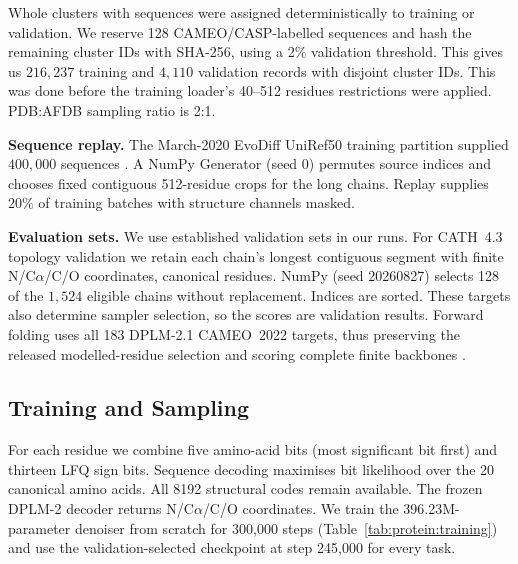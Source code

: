 Whole clusters with sequences were assigned deterministically to training or validation. We reserve 128 CAMEO/CASP-labelled sequences and hash the remaining cluster IDs with SHA-256, using a 2\% validation threshold. This gives us $216{,}237$ training and $4{,}110$ validation records with disjoint cluster IDs. This was done before the training loader's 40--512 residues restrictions were applied. PDB:AFDB sampling ratio is 2:1. 

\textbf{Sequence replay.} The March-2020 EvoDiff UniRef50 training partition supplied $400{,}000$ sequences \citep{protein:uniref}. A NumPy Generator (seed 0) permutes source indices and chooses fixed contiguous 512-residue crops for the long chains. Replay supplies $20\%$ of training batches with structure channels masked.

\textbf{Evaluation sets.} We use established validation sets in our runs. For CATH~4.3 topology validation \citep{protein:cath} we retain each chain's longest contiguous segment with finite N/C$\alpha$/C/O coordinates, canonical residues. NumPy (seed 20260827) selects 128 of the $1{,524}$ eligible chains without replacement. Indices are sorted. These targets also determine sampler selection, so the scores are validation results. Forward folding uses all 183 DPLM-2.1 CAMEO~2022 targets, thus preserving the released modelled-residue selection and scoring complete finite backbones \citep{protein:cameo,protein:dplm2}. 


\subsection{Training and Sampling}
\label{app:protein:training}
\label{app:protein:noise}

For each residue we combine five amino-acid bits (most significant bit first) and thirteen LFQ sign bits. Sequence decoding maximises bit likelihood over the 20 canonical amino acids. All 8192 structural codes remain available. The frozen DPLM-2 decoder returns N/C$\alpha$/C/O coordinates. We train the 396.23M-parameter denoiser from scratch for 300{,}000 steps (Table~\ref{tab:protein:training}) and use the validation-selected checkpoint at step 245{,}000 for every task.

